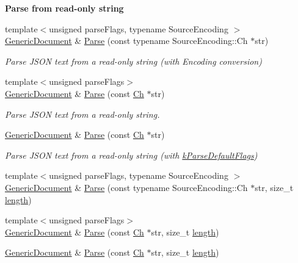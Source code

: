 \begin{Indent}\textbf{ Parse from read-\/only string}\par
\begin{DoxyCompactItemize}
\item 
{\footnotesize template$<$unsigned parse\+Flags, typename Source\+Encoding $>$ }\\\hyperlink{classGenericDocument}{Generic\+Document} \& \hyperlink{classGenericDocument_aadee36db7064cc9894a75c848831cdae}{Parse} (const typename Source\+Encoding\+::\+Ch $\ast$str)
\begin{DoxyCompactList}\small\item\em Parse J\+S\+ON text from a read-\/only string (with Encoding conversion) \end{DoxyCompactList}\item 
{\footnotesize template$<$unsigned parse\+Flags$>$ }\\\hyperlink{classGenericDocument}{Generic\+Document} \& \hyperlink{classGenericDocument_a5e377f840009b5cee6757be29525ce0b}{Parse} (const \hyperlink{classGenericValue_ade0e0ce64ccd5d852da57a35e720bafb}{Ch} $\ast$str)
\begin{DoxyCompactList}\small\item\em Parse J\+S\+ON text from a read-\/only string. \end{DoxyCompactList}\item 
\hyperlink{classGenericDocument}{Generic\+Document} \& \hyperlink{classGenericDocument_a49ae6de6fd0bc820d9864a106c10b4da}{Parse} (const \hyperlink{classGenericValue_ade0e0ce64ccd5d852da57a35e720bafb}{Ch} $\ast$str)
\begin{DoxyCompactList}\small\item\em Parse J\+S\+ON text from a read-\/only string (with \hyperlink{reader_8h_ab7be7dabe6ffcba60fad441505583450a9104b0946d648e9467cb7a967401ec80}{k\+Parse\+Default\+Flags}) \end{DoxyCompactList}\item 
{\footnotesize template$<$unsigned parse\+Flags, typename Source\+Encoding $>$ }\\\hyperlink{classGenericDocument}{Generic\+Document} \& \hyperlink{classGenericDocument_a46b5028cc760c4e915a0d5216af9f7e2}{Parse} (const typename Source\+Encoding\+::\+Ch $\ast$str, size\+\_\+t \hyperlink{imgui__impl__opengl3__loader_8h_a011fc24f10426c01349e94a4edd4b0d5}{length})
\item 
{\footnotesize template$<$unsigned parse\+Flags$>$ }\\\hyperlink{classGenericDocument}{Generic\+Document} \& \hyperlink{classGenericDocument_a93fec16eacec4f4b42075bb3bc242a6b}{Parse} (const \hyperlink{classGenericValue_ade0e0ce64ccd5d852da57a35e720bafb}{Ch} $\ast$str, size\+\_\+t \hyperlink{imgui__impl__opengl3__loader_8h_a011fc24f10426c01349e94a4edd4b0d5}{length})
\item 
\hyperlink{classGenericDocument}{Generic\+Document} \& \hyperlink{classGenericDocument_ab13d8358acc0648e3f91f6b825365e4f}{Parse} (const \hyperlink{classGenericValue_ade0e0ce64ccd5d852da57a35e720bafb}{Ch} $\ast$str, size\+\_\+t \hyperlink{imgui__impl__opengl3__loader_8h_a011fc24f10426c01349e94a4edd4b0d5}{length})
\end{DoxyCompactItemize}
\end{Indent}

